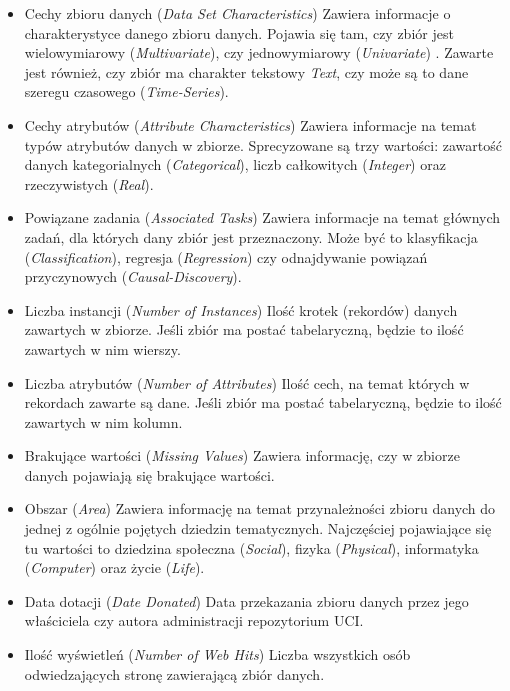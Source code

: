 \begin{itemize}
  \item Cechy zbioru danych (\emph{Data Set Characteristics})
        Zawiera informacje o charakterystyce danego zbioru danych.
        Pojawia się tam, czy zbiór jest wielowymiarowy (\emph{Multivariate}), czy jednowymiarowy (\emph{Univariate}) \footnotemark.
        Zawarte jest również, czy zbiór ma charakter tekstowy \emph{Text}, czy może są to dane szeregu czasowego (\emph{Time-Series}).

  \item Cechy atrybutów (\emph{Attribute Characteristics})
        Zawiera informacje na temat typów atrybutów danych w zbiorze.
        Sprecyzowane są trzy wartości: zawartość danych kategorialnych (\emph{Categorical}), liczb całkowitych (\emph{Integer}) oraz rzeczywistych (\emph{Real}).

  \item Powiązane zadania (\emph{Associated Tasks})
        Zawiera informacje na temat głównych zadań, dla których dany zbiór jest przeznaczony.
        Może być to klasyfikacja (\emph{Classification}), regresja (\emph{Regression}) czy odnajdywanie powiązań przyczynowych (\emph{Causal-Discovery}).

  \item Liczba instancji (\emph{Number of Instances})
        Ilość krotek (rekordów) danych zawartych w zbiorze.
        Jeśli zbiór ma postać tabelaryczną, będzie to ilość zawartych w nim wierszy.

  \item Liczba atrybutów (\emph{Number of Attributes})
        Ilość cech, na temat których w rekordach zawarte są dane.
        Jeśli zbiór ma postać tabelaryczną, będzie to ilość zawartych w nim kolumn.

  \item Brakujące wartości (\emph{Missing Values})
        Zawiera informację, czy w zbiorze danych pojawiają się brakujące wartości.

  \item Obszar (\emph{Area})
        Zawiera informację na temat przynależności zbioru danych do jednej z ogólnie pojętych dziedzin tematycznych.
        Najczęściej pojawiające się tu wartości to dziedzina społeczna (\emph{Social}), fizyka (\emph{Physical}), informatyka (\emph{Computer}) oraz życie (\emph{Life}).

  \item Data dotacji (\emph{Date Donated})
        Data przekazania zbioru danych przez jego właściciela czy autora administracji repozytorium UCI.

  \item Ilość wyświetleń (\emph{Number of Web Hits})
        Liczba wszystkich osób odwiedzających stronę zawierającą zbiór danych.

\end{itemize}

